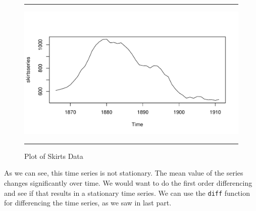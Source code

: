 \documentclass[11pt, letterpaper, twoside]{memoir}\usepackage{knitr}
\begin{document}
\begin{figure}
\centering
\rule{4in}{1pt}
\begin{knitrout}
\color{fgcolor}\begin{kframe}
\begin{alltt}
 \hlkwb{<-} \hlstd{(}\hlstd{,}\hlstd{=}\hlstd{)}
 \hlkwb{<-} \hlstd{=}\hlstd{(}\hlstd{))} 
 
\end{alltt}
\end{kframe}
\includegraphics[width=\maxwidth]{figure/unnamed-chunk-116-1} 

\end{knitrout}
\caption{Plot of Skirts Data}
\label{Fig:plotskirts}
\rule{4in}{1pt}
\end{figure}

As we can see, this time series is not stationary. The mean value of the series changes significantly over time. We would want to do the first order differencing and see if that results in a stationary time series. We can use the \texttt{diff} function for differencing the time series, as we saw in last part.
\end{document}
